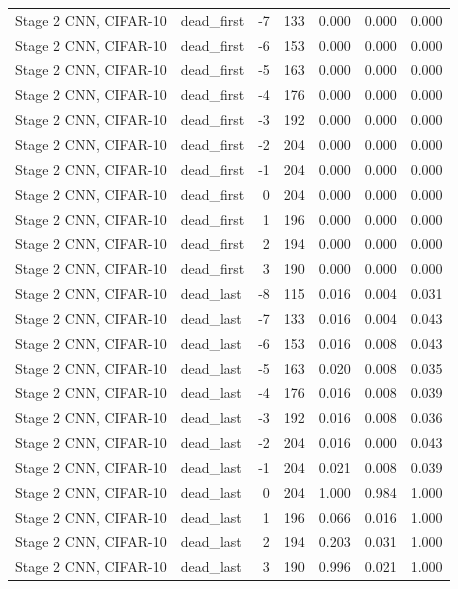 \begin{table}[htbp]
{\begin{tabular}{@{}llrrrrr@{}}
Stage 2 CNN, CIFAR-10 & dead\_first & -7 & 133 & 0.000 & 0.000 & 0.000 \\
Stage 2 CNN, CIFAR-10 & dead\_first & -6 & 153 & 0.000 & 0.000 & 0.000 \\
Stage 2 CNN, CIFAR-10 & dead\_first & -5 & 163 & 0.000 & 0.000 & 0.000 \\
Stage 2 CNN, CIFAR-10 & dead\_first & -4 & 176 & 0.000 & 0.000 & 0.000 \\
Stage 2 CNN, CIFAR-10 & dead\_first & -3 & 192 & 0.000 & 0.000 & 0.000 \\
Stage 2 CNN, CIFAR-10 & dead\_first & -2 & 204 & 0.000 & 0.000 & 0.000 \\
Stage 2 CNN, CIFAR-10 & dead\_first & -1 & 204 & 0.000 & 0.000 & 0.000 \\
Stage 2 CNN, CIFAR-10 & dead\_first & 0 & 204 & 0.000 & 0.000 & 0.000 \\
Stage 2 CNN, CIFAR-10 & dead\_first & 1 & 196 & 0.000 & 0.000 & 0.000 \\
Stage 2 CNN, CIFAR-10 & dead\_first & 2 & 194 & 0.000 & 0.000 & 0.000 \\
Stage 2 CNN, CIFAR-10 & dead\_first & 3 & 190 & 0.000 & 0.000 & 0.000 \\
Stage 2 CNN, CIFAR-10 & dead\_last & -8 & 115 & 0.016 & 0.004 & 0.031 \\
Stage 2 CNN, CIFAR-10 & dead\_last & -7 & 133 & 0.016 & 0.004 & 0.043 \\
Stage 2 CNN, CIFAR-10 & dead\_last & -6 & 153 & 0.016 & 0.008 & 0.043 \\
Stage 2 CNN, CIFAR-10 & dead\_last & -5 & 163 & 0.020 & 0.008 & 0.035 \\
Stage 2 CNN, CIFAR-10 & dead\_last & -4 & 176 & 0.016 & 0.008 & 0.039 \\
Stage 2 CNN, CIFAR-10 & dead\_last & -3 & 192 & 0.016 & 0.008 & 0.036 \\
Stage 2 CNN, CIFAR-10 & dead\_last & -2 & 204 & 0.016 & 0.000 & 0.043 \\
Stage 2 CNN, CIFAR-10 & dead\_last & -1 & 204 & 0.021 & 0.008 & 0.039 \\
Stage 2 CNN, CIFAR-10 & dead\_last & 0 & 204 & 1.000 & 0.984 & 1.000 \\
Stage 2 CNN, CIFAR-10 & dead\_last & 1 & 196 & 0.066 & 0.016 & 1.000 \\
Stage 2 CNN, CIFAR-10 & dead\_last & 2 & 194 & 0.203 & 0.031 & 1.000 \\
Stage 2 CNN, CIFAR-10 & dead\_last & 3 & 190 & 0.996 & 0.021 & 1.000 \\

\end{tabular}}
\end{table}
